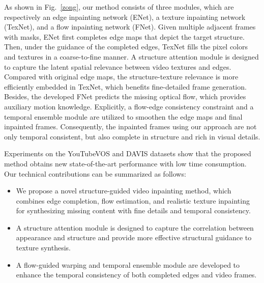 As shown in Fig.~\ref{zong}, our method consists of three modules, which are respectively an edge inpainting network (ENet), a texture inpainting network (TexNet), and a flow inpainting network (FNet).
%
Given multiple adjacent frames with masks, ENet first completes edge maps that depict the target structure. 
Then, under the guidance of the completed edges, TexNet fills the pixel colors and textures in a coarse-to-fine manner.
A structure attention module is designed to capture the latent spatial relevance between video textures and edges.
Compared with original edge maps, the structure-texture relevance is more efficiently embedded in TexNet, which benefits fine-detailed frame generation.
Besides, the developed FNet predicts the missing optical flow, which provides auxiliary motion knowledge. 
Explicitly, a flow-edge consistency constraint and a temporal ensemble module are utilized to smoothen the edge maps and final inpainted frames. 
Consequently, the inpainted frames using our approach are not only temporal consistent, but also complete in structure and rich in visual details.
 

%
Experiments on the YouTubeVOS and DAVIS datasets show that the proposed method obtains new state-of-the-art performance with low time consumption.
%
Our technical contributions can be summarized as follows:
\begin{itemize}
	\item We propose a novel structure-guided video inpainting method, which combines edge completion, flow estimation, and realistic texture inpainting for synthesizing missing content with fine details and temporal consistency.
	\item A structure attention module is designed to capture the correlation between appearance and structure and provide more effective structural guidance to texture synthesis.
	\item A flow-guided warping and temporal ensemble module are developed to enhance the temporal consistency of both completed edges and video frames.   
\end{itemize}


